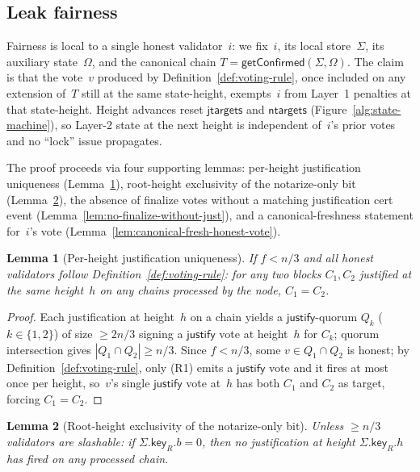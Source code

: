 \documentclass{article}
\newcommand{\just}{\ensuremath{\mathsf{justify}}\xspace}
\newcommand{\jtargets}{\mathsf{jtargets}}
\newcommand{\ntargets}{\mathsf{ntargets}}
\newcommand{\key}{\mathsf{key}}
\newcommand{\getConfirmed}{\textsf{getConfirmed}\xspace}
\theoremstyle{plain}
\newtheorem{lemma}{Lemma}
\theoremstyle{definition}
\theoremstyle{remark}
\begin{document}
\subsection{Leak fairness}

Fairness is local to a single honest validator~$i$: we fix~$i$, its local store~$\Sigma$, its auxiliary state~$\Omega$, and the canonical chain $T = \getConfirmed(\Sigma, \Omega)$.
The claim is that the vote~$v$ produced by Definition~\ref{def:voting-rule}, once included on any extension of~$T$ still at the same state-height, exempts~$i$ from Layer~1 penalties at that state-height.
Height advances reset $\jtargets$ and $\ntargets$ (Figure~\ref{alg:state-machine}), so Layer-2 state at the next height is independent of~$i$'s prior votes and no ``lock'' issue propagates.

The proof proceeds via four supporting lemmas: per-height justification uniqueness (Lemma~\ref{lem:just-unique-height}), root-height exclusivity of the notarize-only bit (Lemma~\ref{lem:root-h-notarize-only}), the absence of finalize votes without a matching justification cert event (Lemma~\ref{lem:no-finalize-without-just}), and a canonical-freshness statement for~$i$'s vote (Lemma~\ref{lem:canonical-fresh-honest-vote}).

\begin{lemma}[Per-height justification uniqueness]\label{lem:just-unique-height}
If $f < n/3$ and all honest validators follow Definition~\ref{def:voting-rule}: for any two blocks $C_1, C_2$ justified at the same height~$h$ on any chains processed by the node, $C_1 = C_2$.
\end{lemma}

\begin{proof}
Each justification at height~$h$ on a chain yields a \just-quorum $Q_k$ ($k \in \{1, 2\}$) of size $\geq 2n/3$ signing a \just vote at height~$h$ for $C_k$; quorum intersection gives $|Q_1 \cap Q_2| \geq n/3$.
Since $f < n/3$, some $v \in Q_1 \cap Q_2$ is honest; by Definition~\ref{def:voting-rule}, only (R1) emits a \just vote and it fires at most once per height, so~$v$'s single \just vote at~$h$ has both $C_1$ and $C_2$ as target, forcing $C_1 = C_2$.
\end{proof}

\begin{lemma}[Root-height exclusivity of the notarize-only bit]\label{lem:root-h-notarize-only}
Unless $\geq n/3$ validators are slashable: if $\Sigma.\key_R.b = 0$, then no justification at height $\Sigma.\key_R.h$ has fired on any processed chain.
\end{lemma}
\end{document}
